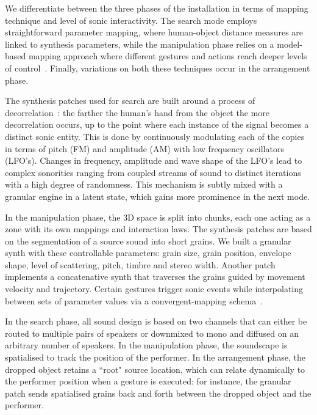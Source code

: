 \documentclass{nime-alternate}
\begin{document}
We differentiate between the three phases of the installation in terms of mapping technique and level of sonic interactivity. The search mode employs straightforward parameter mapping, where human-object distance measures are linked to synthesis parameters, while the manipulation phase relies on a model-based mapping approach where different gestures and actions reach deeper levels of control~\cite{hermann2011sonification}. Finally, variations on both these techniques occur in the arrangement phase.

The synthesis patches used for search are built around a process of decorrelation~\cite{kendall1995decorrelation}: the farther the human's hand from the object the more decorrelation occurs, up to the point where each instance of the signal becomes a distinct sonic entity. This is done by continuously modulating each of the copies in terms of pitch (FM) and amplitude (AM) with low frequency oscillators (LFO’s). Changes in frequency, amplitude and wave shape of the LFO’s lead to complex sonorities ranging from coupled streams of sound to distinct iterations with a high degree of randomness. %
This mechanism is subtly mixed with a granular engine in a latent state, which gains more prominence in the next mode.

In the manipulation phase, the 3D space is split into chunks, each one acting as a zone with its own mappings and interaction laws. The synthesis patches are based on the segmentation of a source sound into short grains. We built a granular synth with these controllable parameters: grain size, grain position, envelope shape, level of scattering, pitch, timbre and stereo width. Another patch implements a concatenative synth that traverses the grains guided by movement velocity and trajectory. Certain gestures trigger sonic events while interpolating between sets of parameter values via a convergent-mapping schema~\cite{hunt2000mapping}. %


In the search phase, all sound design is based on two channels that can either be routed to multiple pairs of speakers or downmixed to mono and diffused on an arbitrary number of speakers. In the manipulation phase, the soundscape is spatialised to track the position of the performer. In the arrangement phase, the dropped object retains a ``root" source location, which can relate dynamically to the performer position when a gesture is executed: for instance, the granular patch sends spatialised grains back and forth between the dropped object and the performer.
\end{document}

